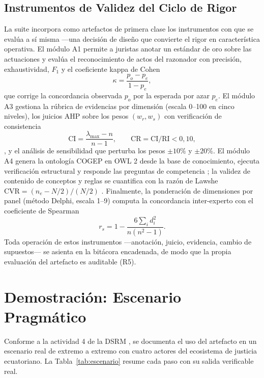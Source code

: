 \documentclass[computers,article,submit,pdftex,moreauthors]{Definitions/mdpi}
\begin{document}
\subsection{Instrumentos de Validez del Ciclo de Rigor}
La suite incorpora como artefactos de primera clase los instrumentos con que se evalúa a sí misma ---una decisión de diseño que convierte el rigor en característica operativa. El módulo A1 permite a juristas anotar un estándar de oro sobre las actuaciones y evalúa el reconocimiento de actos del razonador con precisión, exhaustividad, $F_1$ y el coeficiente kappa de Cohen \cite{Cohen1960}
\begin{equation}
\kappa = \frac{p_o - p_e}{1 - p_e},
\label{eq:kappa}
\end{equation}
que corrige la concordancia observada $p_o$ por la esperada por azar $p_e$. El módulo A3 gestiona la rúbrica de evidencias por dimensión (escala 0--100 en cinco niveles), los juicios AHP sobre los pesos $(w_r, w_s)$ con verificación de consistencia
\begin{equation}
\mathrm{CI} = \frac{\lambda_{\max} - n}{n - 1}, \qquad \mathrm{CR} = \mathrm{CI}/\mathrm{RI} < 0{,}10,
\label{eq:ahp}
\end{equation}
\cite{Saaty1990}, y el análisis de sensibilidad que perturba los pesos $\pm 10\%$ y $\pm 20\%$. El módulo A4 genera la ontología COGEP en OWL 2 desde la base de conocimiento, ejecuta verificación estructural y responde las preguntas de competencia \cite{Uschold1996}; la validez de contenido de conceptos y reglas se cuantifica con la razón de Lawshe $\mathrm{CVR} = (n_e - N/2)/(N/2)$ \cite{Lawshe1975}. Finalmente, la ponderación de dimensiones por panel (método Delphi, escala 1--9) computa la concordancia inter-experto con el coeficiente de Spearman \cite{Spearman1904}
\begin{equation}
r_s = 1 - \frac{6 \sum_i d_i^2}{n(n^2-1)}.
\label{eq:spearman}
\end{equation}
Toda operación de estos instrumentos ---anotación, juicio, evidencia, cambio de supuestos--- se asienta en la bitácora encadenada, de modo que la propia evaluación del artefacto es auditable (R5).

\section{Demostración: Escenario Pragmático}
\label{sec:escenario}

Conforme a la actividad 4 de la DSRM \cite{Peffers2007}, se documenta el uso del artefacto en un escenario real de extremo a extremo con cuatro actores del ecosistema de justicia ecuatoriano. La Tabla~\ref{tab:escenario} resume cada paso con su salida verificable real.
\end{document}
